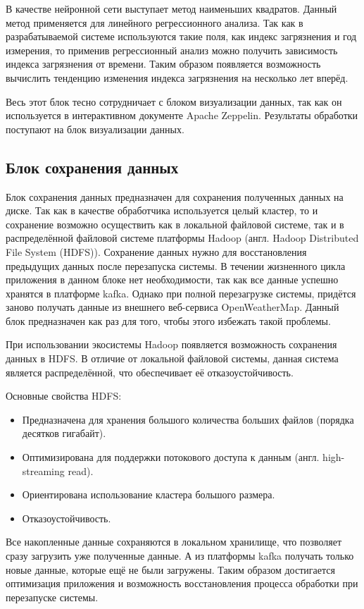 В качестве нейронной сети выступает метод наименьших квадратов.
Данный метод применяется для линейного регрессионного анализа.
Так как в разрабатываемой системе используются такие поля, как индекс загрязнения и год измерения, то применив регрессионный анализ можно получить зависимость индекса загрязнения от времени.
Таким образом появляется возможность вычислить тенденцию изменения индекса загрязнения на несколько лет вперёд.


Весь этот блок тесно сотрудничает с блоком визуализации данных, так как он используется в интерактивном документе Apache Zeppelin.
Результаты обработки поступают на блок визуализации данных.

\subsection{Блок сохранения данных}

Блок сохранения данных предназначен для сохранения полученных данных на диске.
Так как в качестве обработчика используется целый кластер, то и сохранение возможно осуществить как в локальной файловой системе, так и в распределённой файловой системе платформы Hadoop (англ. Hadoop Distributed File System (HDFS)).
Сохранение данных нужно для восстановления предыдущих данных после перезапуска системы.
В течении жизненного цикла приложения в данном блоке нет необходимости, так как все данные успешно хранятся в платформе kafka.
Однако при полной перезагрузке системы, придётся заново получать данные из внешнего веб-сервиса OpenWeatherMap. 
Данный блок предназначен как раз для того, чтобы этого избежать такой проблемы.

При использовании экосистемы Hadoop появляется возможность сохранения данных в HDFS.
В отличие от локальной файловой системы, данная система является распределённой, что обеспечивает её отказоустойчивость.

Основные свойства HDFS:
\begin{itemize}
    \item Предназначена для хранения большого количества больших файлов (порядка десятков гигабайт).
    \item Оптимизирована для поддержки потокового доступа к данным (англ. high-streaming read).
    \item Ориентирована использование кластера большого размера.
    \item Отказоустойчивость.
\end{itemize}

Все накопленные данные сохраняются в локальном хранилище, что позволяет сразу загрузить уже полученные данные.
А из платформы kafka получать только новые данные, которые ещё не были загружены.
Таким образом достигается оптимизация приложения и возможность восстановления процесса обработки при перезапуске системы.



